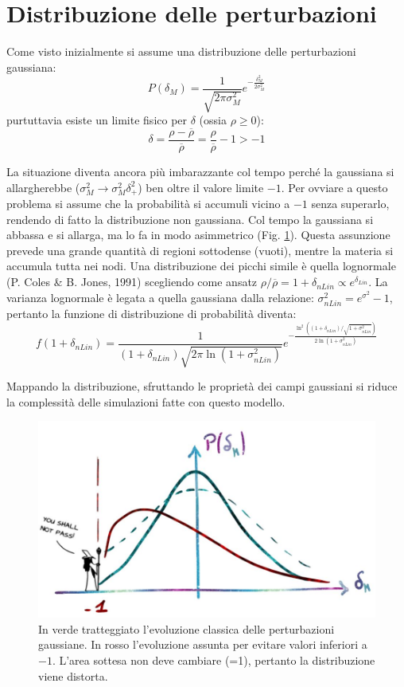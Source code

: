 \section{Distribuzione delle perturbazioni}
Come visto inizialmente si assume una distribuzione delle perturbazioni gaussiana:
\begin{equation}
    P(\delta_M)=\frac{1}{\sqrt{2\pi \sigma_M^2}}e^{-\frac{\delta_M^2}{2\sigma_M^2}}
\end{equation}
purtuttavia esiste un limite fisico per $\delta$ (ossia $\rho \geq 0$):
\begin{equation}
    \delta = \frac{\rho - \overbar{\rho}}{\overbar{\rho}} = \frac{\rho}{\overbar{\rho}}-1 > -1
\end{equation}

La situazione diventa ancora più imbarazzante col tempo perché la gaussiana si allargherebbe ($\sigma_M^2 \to \sigma_M^2 \delta_+^2$) ben oltre il valore limite $-1$. Per ovviare a questo problema si assume che la probabilità si accumuli vicino a $-1$ senza superarlo, rendendo di fatto la distribuzione non gaussiana. Col tempo la gaussiana si abbassa e si allarga, ma lo fa in modo asimmetrico (Fig. \ref{fig8:ultima}). Questa assunzione prevede una grande quantità di regioni sottodense (vuoti), mentre la materia si accumula tutta nei nodi.
Una distribuzione dei picchi simile è quella lognormale (P. Coles \& B. Jones, 1991) scegliendo come ansatz $\rho /\overbar{\rho} = 1+\delta_{nLin} \propto e^{\delta_{Lin}}$. La varianza lognormale è legata a quella gaussiana dalla relazione: $\sigma_{nLin}^2 = e^{\sigma^2}-1$, pertanto la funzione di distribuzione di probabilità diventa:
\begin{equation}
    f(1+\delta_{nLin})= \frac{1}{(1+\delta_{nLin})\sqrt{2\pi \ln(1+\sigma_{nLin}^2)}}e^{-\frac{\ln^2\left((1+\delta_{nLin})/\sqrt{1+\sigma_{nLin}^2}\right)}{2 \ln(1+\sigma_{nLin}^2)}}
\end{equation}

Mappando la distribuzione, sfruttando le proprietà dei campi gaussiani si riduce la complessità delle simulazioni fatte con questo modello. 

\begin{figure}[H]
    \centering
    \includegraphics[width=.75 \textwidth]{Pictures/8/pdfevol.jpg}
    \caption{In verde tratteggiato l'evoluzione classica delle perturbazioni gaussiane. In rosso l'evoluzione assunta per evitare valori inferiori a $-1$. L'area sottesa non deve cambiare (=1), pertanto la distribuzione viene distorta.}\label{fig8:ultima}
\end{figure}

